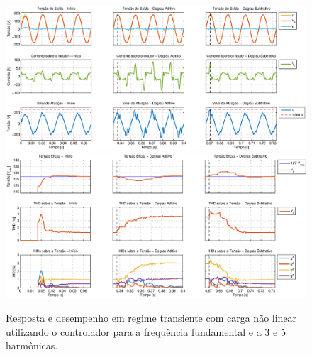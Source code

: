 \documentclass[repeatfields,oneside,overleaf]{tcc}
\begin{document}
\begin{figure}[h]
    \centering
    \caption{Resposta e desempenho em regime transiente com carga não linear utilizando o controlador para a frequência fundamental e a 3{\textordfeminine} e 5{\textordfeminine} harmônicas.}
    \includegraphics[trim={80 50 1 20}, clip, width=\linewidth]{fig/closed_5.eps}
    \\\vspace{0.475cm}
    \includegraphics[trim={80 20 1 20}, clip, width=\linewidth]{fig/harm_5.eps}
\end{figure}
\end{document}
